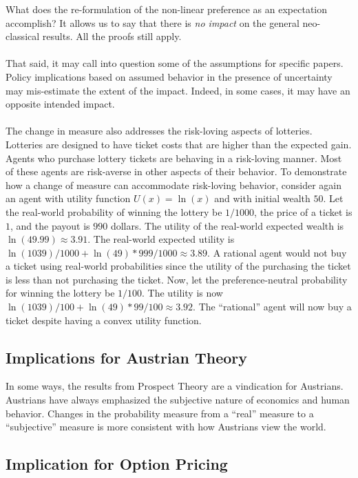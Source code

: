 \documentclass{article}
\begin{document}
What does the re-formulation of the non-linear preference as an expectation accomplish?  It allows us to say that there is \emph{no impact} on the general neo-classical results.  All the proofs still apply. 
\\
\\
That said, it may call into question some of the assumptions for specific papers.  Policy implications based on assumed behavior in the presence of uncertainty may mis-estimate the extent of the impact.  Indeed, in some cases, it may have an opposite intended impact. 
\\
\\
The change in measure also addresses the risk-loving aspects of lotteries.  Lotteries are designed to have ticket costs that are higher than the expected gain.  Agents who purchase lottery tickets are behaving in a risk-loving manner.  Most of these agents are risk-averse in other aspects of their behavior.  To demonstrate how a change of measure can accommodate risk-loving behavior, consider again an agent with utility function \(U(x)=\ln(x)\) and with initial wealth \(50\).  Let the real-world probability of winning the lottery be \(1/1000\), the price of a ticket is \(1\), and the payout is \(990\) dollars.  The utility of the real-world expected wealth is \(\ln(49.99)\approx 3.91\).  The real-world expected utility is \(\ln(1039)/1000+\ln(49)*999/1000 \approx 3.89 \).  A rational agent would not buy a ticket using real-world probabilities since the utility of the purchasing the ticket is less than not purchasing the ticket.  Now, let the preference-neutral probability for winning the lottery be \(1/100\).  The utility is now \(\ln(1039)/100+\ln(49)*99/100 \approx 3.92 \).  The ``rational'' agent will now buy a ticket despite having a convex utility function.  

\subsection{Implications for Austrian Theory}

In some ways, the results from Prospect Theory are a vindication for Austrians.  Austrians have always emphasized the subjective nature of economics and human behavior.  Changes in the probability measure from a ``real'' measure to a ``subjective'' measure is more consistent with how Austrians view the world.  

\subsection{Implication for Option Pricing}
\end{document}
